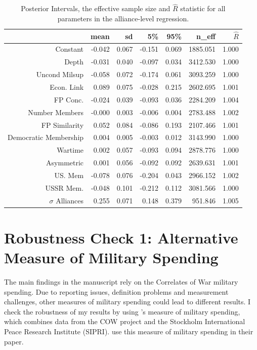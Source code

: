 \documentclass[12pt]{article}
\begin{document}
\begin{table}[ht]
\centering
\begin{tabular}{rrrrrrr}
  \hline
 & mean & sd & 5\% & 95\% & n\_eff & $\hat{R}$ \\ 
  \hline
Constant & -0.042 & 0.067 & -0.151 & 0.069 & 1885.051 & 1.000 \\ 
  Depth & -0.031 & 0.040 & -0.097 & 0.034 & 3412.530 & 1.000 \\ 
  Uncond Milsup & -0.058 & 0.072 & -0.174 & 0.061 & 3093.259 & 1.000 \\ 
  Econ. Link & 0.089 & 0.075 & -0.028 & 0.215 & 2602.695 & 1.001 \\ 
  FP Conc. & -0.024 & 0.039 & -0.093 & 0.036 & 2284.209 & 1.004 \\ 
  Number Members & -0.000 & 0.003 & -0.006 & 0.004 & 2783.488 & 1.002 \\ 
  FP Similarity & 0.052 & 0.084 & -0.086 & 0.193 & 2107.466 & 1.001 \\ 
  Democratic Membership & 0.004 & 0.005 & -0.003 & 0.012 & 3143.990 & 1.000 \\ 
  Wartime & 0.002 & 0.057 & -0.093 & 0.094 & 2878.776 & 1.000 \\ 
  Asymmetric & 0.001 & 0.056 & -0.092 & 0.092 & 2639.631 & 1.001 \\ 
  US. Mem & -0.078 & 0.076 & -0.204 & 0.043 & 2966.152 & 1.002 \\ 
  USSR Mem. & -0.048 & 0.101 & -0.212 & 0.112 & 3081.566 & 1.000 \\ 
  $\sigma$ Alliances & 0.255 & 0.071 & 0.148 & 0.379 & 951.846 & 1.005 \\ 
   \hline
\end{tabular}
\caption{Posterior Intervals, the effective sample size and $\hat{R}$ statistic for all parameters in the alliance-level regression.} 
\label{tab:alliance-level-min} 
\end{table}


\section{Robustness Check 1: Alternative Measure of Military Spending}

The main findings in the manuscript rely on the Correlates of War military spending. 
Due to reporting issues, definition problems and measurement challenges, other measures of military spending could lead to different results. 
I check the robustness of my results by using \citet{Nordhausetal2012}'s measure of military spending, which combines data from the COW project and the Stockholm International Peace Research Institute (SIPRI). 
\citet{DigiuseppePoast2016} use this measure of military spending in their paper. 
\end{document}
